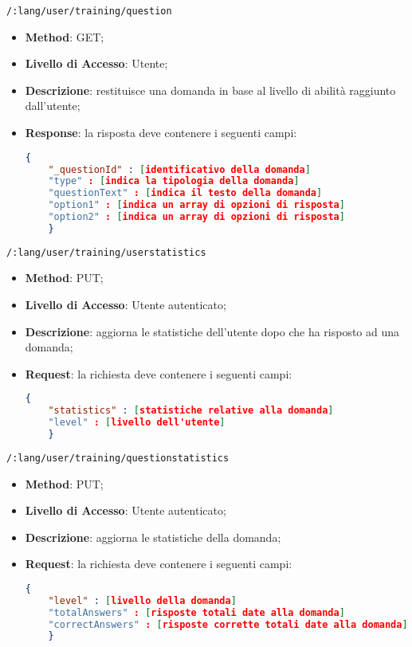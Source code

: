 \item \texttt{/:lang/user/training/question}
\begin{itemize}
	\item \textbf{Method}: GET;
	\item \textbf{Livello di Accesso}: Utente;
	\item \textbf{Descrizione}: restituisce una domanda in base al livello di abilità raggiunto dall'utente;
	\item \textbf{Response}: la risposta deve contenere i seguenti campi:
	\begin{lstlisting}[language=json,firstnumber=1]
	{
	"_questionId" : [identificativo della domanda]
	"type" : [indica la tipologia della domanda]
	"questionText" : [indica il testo della domanda]
	"option1" : [indica un array di opzioni di risposta]
	"option2" : [indica un array di opzioni di risposta]
	}
	\end{lstlisting}
\end{itemize}

\item \texttt{/:lang/user/training/userstatistics}
\begin{itemize}
	\item \textbf{Method}: PUT;
	\item \textbf{Livello di Accesso}: Utente autenticato;
	\item \textbf{Descrizione}: aggiorna le statistiche dell'utente dopo che ha risposto ad una domanda;
	\item \textbf{Request}: la richiesta deve contenere i seguenti campi:
	\begin{lstlisting}[language=json,firstnumber=1]
	{
	"statistics" : [statistiche relative alla domanda]
	"level" : [livello dell'utente]
	}
	\end{lstlisting}	
\end{itemize}

\item \texttt{/:lang/user/training/questionstatistics}
\begin{itemize}
	\item \textbf{Method}: PUT;
	\item \textbf{Livello di Accesso}: Utente autenticato;
	\item \textbf{Descrizione}: aggiorna le statistiche della domanda;
	\item \textbf{Request}: la richiesta deve contenere i seguenti campi:
	\begin{lstlisting}[language=json,firstnumber=1]
	{
	"level" : [livello della domanda]
	"totalAnswers" : [risposte totali date alla domanda]
	"correctAnswers" : [risposte corrette totali date alla domanda]
	}
	\end{lstlisting}
\end{itemize}

